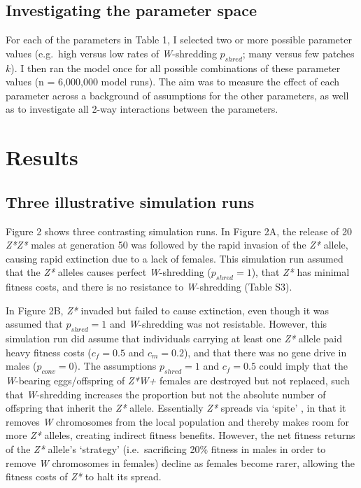 \documentclass[]{rsos}%
\begin{document}
\hypertarget{investigating-the-parameter-space}{%
\subsection{Investigating the parameter
space}\label{investigating-the-parameter-space}}

For each of the parameters in Table 1, I selected two or more possible
parameter values (e.g.~high versus low rates of \emph{W}-shredding
\(p_{shred}\); many versus few patches \(k\)). I then ran the model once
for all possible combinations of these parameter values (n = 6,000,000
model runs). The aim was to measure the effect of each parameter across
a background of assumptions for the other parameters, as well as to
investigate all 2-way interactions between the parameters.

\hypertarget{results}{%
\section{Results}\label{results}}

\hypertarget{three-illustrative-simulation-runs}{%
\subsection{Three illustrative simulation
runs}\label{three-illustrative-simulation-runs}}

Figure 2 shows three contrasting simulation runs. In Figure 2A, the
release of 20 \emph{Z*Z*} males at generation 50 was followed by the
rapid invasion of the \emph{Z*} allele, causing rapid extinction due to
a lack of females. This simulation run assumed that the \emph{Z*}
alleles causes perfect \emph{W}-shredding (\(p_{shred} = 1\)), that
\emph{Z*} has minimal fitness costs, and there is no resistance to
\emph{W}-shredding (Table S3).

In Figure 2B, \emph{Z*} invaded but failed to cause extinction, even
though it was assumed that \(p_{shred} = 1\) and \emph{W}-shredding was
not resistable. However, this simulation run did assume that individuals
carrying at least one \emph{Z*} allele paid heavy fitness costs
(\(c_f = 0.5\) and \(c_m = 0.2\)), and that there was no gene drive in
males (\(p_{conv} = 0\)). The assumptions \(p_{shred} = 1\) and
\(c_f = 0.5\) could imply that the \emph{W}-bearing eggs/offspring of
\emph{Z*W+} females are destroyed but not replaced, such that
\emph{W}-shredding increases the proportion but not the absolute number
of offspring that inherit the \emph{Z*} allele. Essentially \emph{Z*}
spreads via `spite' \citep{gardner2006sp}, in that it removes \emph{W}
chromosomes from the local population and thereby makes room for more
\emph{Z*} alleles, creating indirect fitness benefits. However, the net
fitness returns of the \emph{Z*} allele's `strategy' (i.e.~sacrificing
20\% fitness in males in order to remove \emph{W} chromosomes in
females) decline as females become rarer, allowing the fitness costs of
\emph{Z*} to halt its spread.
\end{document}
